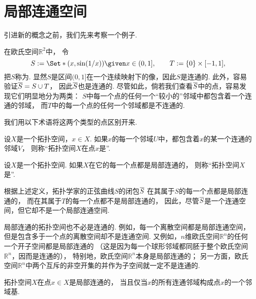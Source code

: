 \section{局部连通空间}
引进新的概念之前，我们先来考察一个例子.
\begin{example}
在欧氏空间\(\mathbb{R}^2\)中，
令\begin{equation*}
	S \defeq \Set*{
		(x,\sin(1/x))
		\given
		x\in(0,1]
	},
	\qquad
	T \defeq \{0\}\times[-1,1],
\end{equation*}
把\(S\)称为.
显然\(S\)是区间\((0,1]\)在一个连续映射下的像，因此\(S\)是连通的.
此外，容易验证\(\overline{S} = S \cup T\)，
因此\(\overline{S}\)也是连通的.
尽管如此，倘若我们查看\(\overline{S}\)中的点，容易发现它们明显地分为两类：
\(S\)中每一个点的任何一个“较小的”邻域中都包含着一个连通的邻域，
而\(T\)中的每一个点的任何一个邻域都是不连通的.
\end{example}
我们用以下术语将这两个类型的点区别开来.
\begin{definition}
设\(X\)是一个拓扑空间，\(x \in X\).
如果\(x\)的每一个邻域\(U\)中，都包含着\(x\)的某一个连通的邻域\(V\)，
则称“拓扑空间\(X\)在点\(x\)是”.
\end{definition}
\begin{definition}
设\(X\)是一个拓扑空间.
如果\(X\)在它的每一个点都是局部连通的，
则称“拓扑空间\(X\)是”.
\end{definition}

根据上述定义，拓扑学家的正弦曲线\(S\)的闭包\(\overline{S}\)
在其属于\(S\)的每一个点都是局部连通的，
而在其属于\(T\)的每一个点都不是局部连通的，
因此，尽管\(\overline{S}\)是一个连通空间，但它却不是一个局部连通空间.

局部连通的拓扑空间也不必是连通的.
例如，每一个离散空间都是局部连通空间，但是包含多于一个点的离散空间却不是连通空间.
又例如，\(n\)维欧氏空间\(\mathbb{R}^n\)的任何一个开子空间都是局部连通的
（这是因为每一个球形邻域都同胚于整个欧氏空间\(\mathbb{R}^n\)，因而是连通的），
特别地，欧氏空间\(\mathbb{R}^n\)本身是局部连通的；
另一方面，欧氏空间\(\mathbb{R}^n\)中两个互斥的非空开集的并作为子空间就一定不是连通的.

\begin{proposition}
拓扑空间\(X\)在点\(x \in X\)是局部连通的，
当且仅当\(x\)的所有连通邻域构成点\(x\)的一个邻域基.
\end{proposition}

